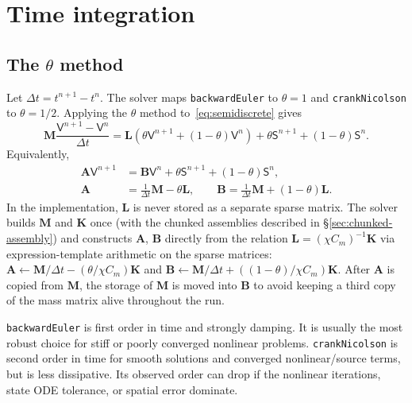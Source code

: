 \documentclass[11pt,a4paper]{article}
\newcommand{\code}[1]{\texttt{\small #1}}
\newcommand{\Mmass}{\mathbf{M}}
\newcommand{\Kstif}{\mathbf{K}}
\newcommand{\Lop}{\mathbf{L}}
\newcommand{\Aimp}{\mathbf{A}}
\newcommand{\Bimp}{\mathbf{B}}
\begin{document}
\section{Time integration}

\subsection{The \texorpdfstring{$\theta$}{theta} method}

Let $\Delta t=t^{n+1}-t^n$. The solver maps \code{backwardEuler} to
$\theta=1$ and \code{crankNicolson} to $\theta=1/2$. Applying the
$\theta$ method to~\eqref{eq:semidiscrete} gives
\begin{equation}
  \Mmass\frac{\mathsf{V}^{n+1}-\mathsf{V}^{n}}{\Delta t}
  =
  \Lop\left(\theta\mathsf{V}^{n+1}+(1-\theta)\mathsf{V}^{n}\right)
  +
  \theta\mathsf{S}^{n+1}
  +(1-\theta)\mathsf{S}^{n}.
  \label{eq:theta}
\end{equation}
Equivalently,
\begin{align}
  \Aimp \mathsf{V}^{n+1}
  &=
  \Bimp \mathsf{V}^{n}
  +\theta\mathsf{S}^{n+1}
  +(1-\theta)\mathsf{S}^{n},
  \label{eq:implicit-system}\\
  \Aimp &= \frac{1}{\Delta t}\Mmass-\theta\Lop,\qquad
  \Bimp = \frac{1}{\Delta t}\Mmass+(1-\theta)\Lop.
\end{align}
In the implementation, $\Lop$ is never stored as a separate sparse matrix. The
solver builds $\Mmass$ and $\Kstif$ once (with the chunked assemblies described
in \S\ref{sec:chunked-assembly}) and constructs $\Aimp$, $\Bimp$ directly from
the relation $\Lop=(\chi C_m)^{-1}\Kstif$ via expression-template arithmetic on
the sparse matrices: $\Aimp\leftarrow\Mmass/\Delta t-(\theta/\chi C_m)\Kstif$
and $\Bimp\leftarrow\Mmass/\Delta t+((1-\theta)/\chi C_m)\Kstif$. After
$\Aimp$ is copied from $\Mmass$, the storage of $\Mmass$ is moved into $\Bimp$
to avoid keeping a third copy of the mass matrix alive throughout the run.

\code{backwardEuler} is first order in time and strongly damping. It is usually
the most robust choice for stiff or poorly converged nonlinear problems.
\code{crankNicolson} is second order in time for smooth solutions and converged
nonlinear/source terms, but is less dissipative. Its observed order can drop if
the nonlinear iterations, state ODE tolerance, or spatial error dominate.
\end{document}
